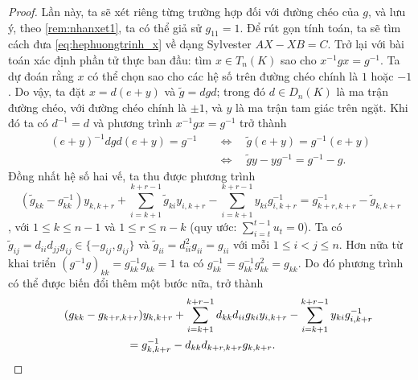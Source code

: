 \begin{proof}
Lần này, ta sẽ xét riêng từng trường hợp đối với đường chéo của $g$, và lưu ý, theo \cref{rem:nhanxet1}, ta có thể giả sử $g_{11} = 1$. Để rút gọn tính toán, ta sẽ tìm cách đưa \cref{eq:hephuongtrinh_x} về dạng Sylvester \( AX - XB = C \). Trở lại với bài toán xác định phần tử thực ban đầu: tìm \( x \in T_n(K) \) sao cho \( x^{-1} g x = g^{-1} \). Ta dự đoán rằng $x$ có thể chọn sao cho các hệ số trên đường chéo chính là \( 1 \) hoặc \( - 1\). Do vậy, ta đặt $x = d (e + y)$ và $\tilde{g} = dgd$; trong đó \( d\in D_n(K) \) là ma trận đường chéo, với đường chéo chính là \( \pm 1 \), và \( y \) là ma trận tam giác trên ngặt. Khi đó ta có $d^{-1} = d$ và phương trình $x^{-1} g x = g^{-1}$ trở thành
\begin{align*}
    (e + y)^{-1} d g d (e + y) = g^{-1}
    & \quad\Longleftrightarrow\quad
    \tilde{g} (e + y) = g^{-1} (e + y) \\
    & \quad\Longleftrightarrow\quad
    \tilde{g} y - y g^{-1} = g^{-1} - g.
\end{align*}
Đồng nhất hệ số hai vế, ta thu được phương trình
\[
    (\tilde{g}_{kk} - g^{-1}_{kk}) y_{k,k+r} +  
    \sum_{i = k + 1}^{k + r - 1} \tilde{g}_{ki} y_{i,k+r} - \sum_{i = k + 1}^{k + r - 1} y_{ki} g^{-1}_{i,k+r} = g^{-1}_{k+r,k+r} - \tilde{g}_{k,k+r} 
\]
, với $1 \le k \le n - 1$ và \( 1 \le r \le n-k\) (quy ước: \( \sum_{i = t}^{t - 1}u_t = 0 \)). Ta có $\tilde{g}_{ij} = d_{ii} d_{jj} g_{ij} \in \{-g_{ij}, g_{ij}\}$ và $\tilde{g}_{ii} = d_{ii}^2 g_{ii} = g_{ii}$ với mỗi \( 1 \le i < j \le n \). Hơn nữa từ khai triển $(g^{-1} g)_{kk} = g^{-1}_{kk} g_{kk} = 1$ ta có $g^{-1}_{kk} = g^{-1}_{kk} g_{kk}^2 = g_{kk}$. Do đó phương trình có thể được biến đổi thêm một bước nữa, trở thành
\begin{multline} \label{eq:phuongtrinh_x_Sylvester}
    \hspace{0.5cm}
    (g_{kk} - g_{k+r,k+r}) y_{k,k+r} +  
    \sum_{i = k + 1}^{k + r - 1} d_{kk} d_{ii} g_{ki} y_{i,k+r} - \sum_{i = k + 1}^{k + r - 1} y_{ki} g^{-1}_{i,k+r} \\
    = g^{-1}_{k,k+r} - d_{kk} d_{k+r,k+r} g_{k,k+r}. \hspace{0.5cm}
\end{multline}


\end{proof}
